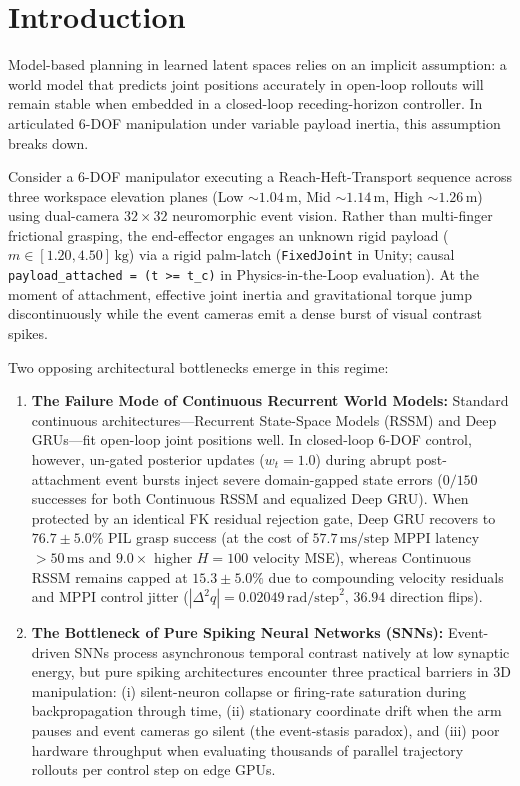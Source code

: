 \documentclass[11pt]{article}
\begin{document}
\section{Introduction}

Model-based planning in learned latent spaces relies on an implicit assumption: a world model that predicts joint positions accurately in open-loop rollouts will remain stable when embedded in a closed-loop receding-horizon controller. In articulated 6-DOF manipulation under variable payload inertia, this assumption breaks down.

Consider a 6-DOF manipulator executing a Reach-Heft-Transport sequence across three workspace elevation planes (Low $\sim 1.04\,\text{m}$, Mid $\sim 1.14\,\text{m}$, High $\sim 1.26\,\text{m}$) using dual-camera $32 \times 32$ neuromorphic event vision. Rather than multi-finger frictional grasping, the end-effector engages an unknown rigid payload ($m \in [1.20, 4.50]\,\text{kg}$) via a rigid palm-latch (\texttt{FixedJoint} in Unity; causal \texttt{payload\_attached = (t >= t\_c)} in Physics-in-the-Loop evaluation). At the moment of attachment, effective joint inertia and gravitational torque jump discontinuously while the event cameras emit a dense burst of visual contrast spikes.

Two opposing architectural bottlenecks emerge in this regime:

\begin{enumerate}
    \item \textbf{The Failure Mode of Continuous Recurrent World Models:} Standard continuous architectures---Recurrent State-Space Models (RSSM) and Deep GRUs---fit open-loop joint positions well. In closed-loop 6-DOF control, however, un-gated posterior updates ($w_t=1.0$) during abrupt post-attachment event bursts inject severe domain-gapped state errors ($0/150$ successes for both Continuous RSSM and equalized Deep GRU). When protected by an identical FK residual rejection gate, Deep GRU recovers to $76.7 \pm 5.0\%$ PIL grasp success (at the cost of $57.7\,\text{ms/step}$ MPPI latency $> 50\,\text{ms}$ and $9.0\times$ higher $H=100$ velocity MSE), whereas Continuous RSSM remains capped at $15.3 \pm 5.0\%$ due to compounding velocity residuals and MPPI control jitter ($|\Delta^2 q| = 0.02049\,\text{rad/step}^2$, $36.94$ direction flips).
    \item \textbf{The Bottleneck of Pure Spiking Neural Networks (SNNs):} Event-driven SNNs process asynchronous temporal contrast natively at low synaptic energy, but pure spiking architectures encounter three practical barriers in 3D manipulation: (i) silent-neuron collapse or firing-rate saturation during backpropagation through time, (ii) stationary coordinate drift when the arm pauses and event cameras go silent (the event-stasis paradox), and (iii) poor hardware throughput when evaluating thousands of parallel trajectory rollouts per control step on edge GPUs.
\end{enumerate}
\end{document}
